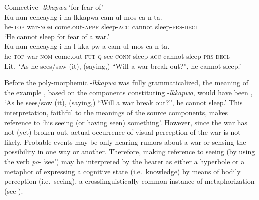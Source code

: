 \documentclass[output=paper,colorlinks,citecolor=brown]{langscibook}
\begin{document}
\ea \label{ex:RK17} \textnormal{Connective} \textit{-lkkapwa} \textnormal{`for fear of'} \\
\ea \label{ex:RK17a}
\gll Ku-nun cencayng-i na-lkkapwa cam-ul mos ca-n-ta. \\
he-\textsc{top} war-\textsc{nom} come.out-\textsc{appr} sleep-\textsc{acc} cannot sleep-\textsc{prs-decl} \\
\glt `He cannot sleep for fear of a war.' \\
\ex \label{ex:RK17b}
\gll Ku-nun cencayng-i na-l-kka pw-a cam-ul mos ca-n-ta. \\
he-\textsc{top} war-\textsc{nom} come.out-\textsc{fut-q} see-\textsc{conn} sleep-\textsc{acc} cannot sleep-\textsc{prs-decl} \\
\glt Lit.\ `As he sees/saw (it), (saying,) ``Will a war break out?'', he cannot sleep.'
\z
\z


 Before the poly-morphemic \nobreakdash-\textit{lkkapwa} was fully grammaticalized, the meaning of the example , based on the components constituting \nobreakdash-\textit{lkkapwa}, would have been , `As he sees/saw (it), (saying,) ``Will a war break out?'', he cannot sleep.' This interpretation, faithful to the meanings of the source components, makes reference to `his seeing (or having seen) something'. However, since the war has not (yet) broken out, actual occurrence of visual perception of the war is not likely. Probable events may be only hearing rumors about a war or sensing the possibility in one way or another. Therefore, making reference to seeing (by using the verb \textit{po}- `see') may be interpreted by the hearer as either a hyperbole or a metaphor of expressing a cognitive state (i.e.\  knowledge) by means of bodily perception (i.e.\  seeing), a crosslinguistically common instance of metaphorization (see \citealt{LakoffJohnson80,Sweetser1990}). 
\end{document}
